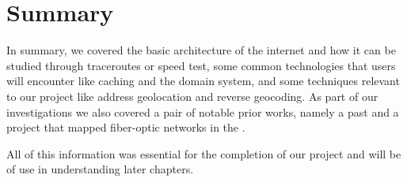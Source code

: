\section{Summary}

In summary, we covered the basic architecture of the internet and how it can be studied through traceroutes or speed test, some common technologies that users will encounter like caching and the domain system, and some techniques relevant to our project like \ip address geolocation and reverse geocoding. As part of our investigations we also covered a pair of notable prior works, namely a past \wpi \mqp and a project that mapped fiber-optic networks in the \us.

All of this information was essential for the completion of our project and will be of use in understanding later chapters.
